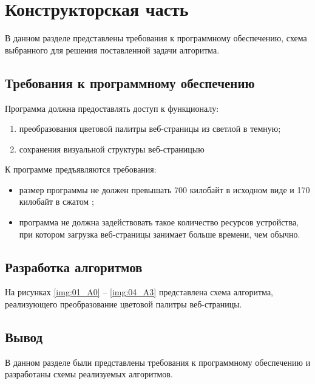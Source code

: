 \chapter{Конструкторская часть}

В данном разделе представлены требования к программному обеспечению, схема выбранного для решения поставленной задачи алгоритма.

\section{Требования к программному обеспечению}

Программа должна предоставлять доступ к функционалу:
\begin{enumerate}[label={\arabic*)}]
	\item преобразования цветовой палитры веб-страницы из светлой в темную;
	\item сохранения визуальной структуры веб-страницыю
\end{enumerate}

К программе предъявляются требования:
\begin{itemize}
	\item размер программы не должен превышать 700 килобайт в исходном виде и 170 килобайт в сжатом \cite{jscost};
	\item программа не должна задействовать такое количество ресурсов устройства, при котором загрузка веб-страницы занимает больше времени, чем обычно.
\end{itemize}

\section{Разработка алгоритмов}

На рисунках \ref{img:01_A0} -- \ref{img:04_A3} представлена схема алгоритма, реализующего преобразование цветовой палитры веб-страницы.


\section*{Вывод}

В данном разделе были представлены требования к программному обеспечению и разработаны схемы реализуемых алгоритмов.